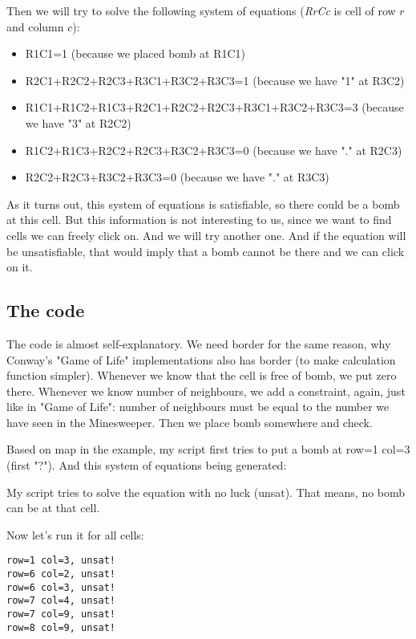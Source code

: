 Then we will try to solve the following system of equations (\emph{RrCc} is cell of row $r$ and column $c$):

\begin{itemize}
\item R1C1=1                                         (because we placed bomb at R1C1)	
\item R2C1+R2C2+R2C3+R3C1+R3C2+R3C3=1                (because we have "1" at R3C2)	
\item R1C1+R1C2+R1C3+R2C1+R2C2+R2C3+R3C1+R3C2+R3C3=3 (because we have "3" at R2C2)	
\item R1C2+R1C3+R2C2+R2C3+R3C2+R3C3=0                (because we have "." at R2C3)	
\item R2C2+R2C3+R3C2+R3C3=0                          (because we have "." at R3C3)
\end{itemize}

As it turns out, this system of equations is satisfiable, so there could be a bomb at this cell.
But this information is not interesting to us, since we want to find cells we can freely click on.
And we will try another one.
And if the equation will be unsatisfiable, that would imply that a bomb cannot be there and we can click on it.

\subsection{The code}



The code is almost self-explanatory.
We need border for the same reason, why Conway's "Game of Life" implementations also has border (to make calculation
function simpler).
Whenever we know that the cell is free of bomb, we put zero there.
Whenever we know number of neighbours, we add a constraint, again, just like in "Game of Life": number of neighbours must be equal to the number we have seen in the Minesweeper.
Then we place bomb somewhere and check.

Based on map in the example, my script first tries to put a bomb at row=1 col=3 (first "?").
And this system of equations being generated:



My script tries to solve the equation with no luck (unsat). That means, no bomb can be at that cell.

Now let's run it for all cells:

\begin{lstlisting}
row=1 col=3, unsat!
row=6 col=2, unsat!
row=6 col=3, unsat!
row=7 col=4, unsat!
row=7 col=9, unsat!
row=8 col=9, unsat!
\end{lstlisting}

